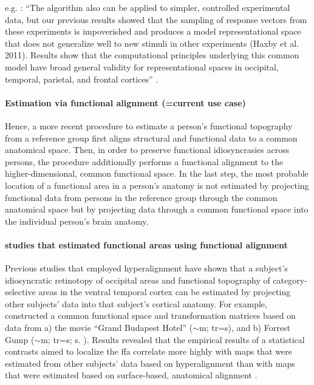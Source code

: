 
e.g. \citet{guntupalli2016model}: ``The algorithm also can be applied to
simpler, controlled experimental data, but our previous results showed that the
sampling of response vectors from these experiments is impoverished and produces
a model representational space that does not generalize well to new stimuli in
other experiments (Haxby et al.  2011). Results show that the computational
principles underlying this common model have broad general validity for
representational spaces in occipital, temporal, parietal, and frontal cortices''
\citep{guntupalli2016model}.


\paragraph{Estimation via functional alignment (=current use case)}


%
Hence, a more recent procedure to estimate a person's functional topography from
a reference group first aligns structural and functional data to a common
anatomical space. Then, in order to preserve functional idiosyncrasies across
persons, the procedure additionally performs a functional alignment to
the higher-dimensional, common functional space.
In the last step, the most probable location of a functional area in a person's
anatomy is not estimated by projecting functional data from persons in the
reference group through the common anatomical space but by projecting data
through a common functional space into the individual person's brain anatomy.


\paragraph{studies that estimated functional areas using functional alignment}


Previous studies \citep{jiahui2020predicting, guntupalli2016model,
haxby2011common} that employed hyperalignment have shown that a subject's
idiosyncratic retinotopy of occipital areas and functional topography of
category-selective areas in the ventral temporal cortex can be estimated by
projecting other subjects' data into that subject's cortical anatomy.
For example, \citep{jiahui2020predicting} constructed a common functional space
and transformation matrices based on data from a) the movie ``Grand Budapest
Hotel'' ($\sim$\unit[50]{m}; \ac{tr}=\unit[1]{s}), and b) Forrest Gump
($\sim$\unit[120]{m}; \ac{tr}=\unit[2]{s}; s. \citep{hanke2016simultaneous}).
Results revealed that the empirical results of a statistical contrasts aimed to
localize the \ac{ffa} correlate more highly with maps that were estimated from
other subjects' data based on hyperalignment than with maps that were estimated
based on surface-based, anatomical alignment \citep{jiahui2020predicting}.


